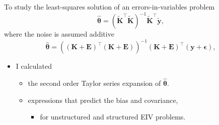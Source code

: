 \documentclass[presentation]{beamer}
\begin{document}
\begin{frame}[label={slide:statistical1}]{To study the least-squares solution of \linebreak an errors-in-variables problem}
\begin{equation*} \widehat{\bm{\theta}} = ( \widetilde{\mathbf{K}}^\top \widetilde{\mathbf{K}} )^{-1} \widetilde{\mathbf{K}}^\top \widetilde{\mathbf{y}} , \end{equation*}
where the noise is assumed additive
\begin{equation*} \widehat{\bm{\theta}} = \left( (\mathbf{K}+\mathbf{E})^\top (\mathbf{K}+\mathbf{E})  \right)^{-1} (\mathbf{K}+\mathbf{E})^\top (\mathbf{y}+\bm{\epsilon}) , \end{equation*} 
\vspace{5mm} 
\begin{itemize}
	\color{blue}
	\item I calculated 
	\begin{itemize}
		\color{blue}
		\item the second order Taylor series expansion of $\widehat{\bm{\theta}}$. 
		\item  expressions that predict the bias and covariance,
		\begin{itemize}
			\color{blue}
			\item for unstructured and structured EIV problems.  
		\end{itemize}
	\end{itemize}
\end{itemize}

\end{frame}
\end{document}

